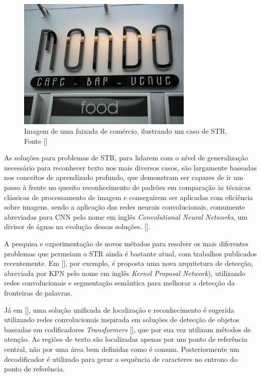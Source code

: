 \begin{figure}
    \centering
    \includegraphics[width=0.75\textwidth]{figs/img_139.jpg}
    \caption{Imagem de uma faixada de comércio, ilustrando um caso de STR. Fonte []}
    \label{fig:str-example}
\end{figure}

As soluções para problemas de STR, para lidarem com o nível de generalização necessário para reconhecer texto nos mais diversos casos, são largamente baseadas nos conceitos de aprendizado profundo, que demonstram ser capazes de ir um passo à frente no quesito reconhecimento de padrões em comparação às técnicas clássicas de processamento de imagem e conseguirem ser aplicadas com eficiência sobre imagens, sendo a aplicação das redes neurais convolucionais, comumente abreviadas para CNN pelo nome em inglês \textit{Convolutional Neural Networks}, um divisor de águas na evolução dessas soluções. [].

A pesquisa e experimentação de novos métodos para resolver os mais diferentes problemas que permeiam o STR ainda é bastante atual, com trabalhos publicados recentemente.
Em [], por exemplo, é proposta uma nova arquitetura de detecção, abreviada por KPN pelo nome em inglês \textit{Kernel Proposal Network}), utilizando redes convolucionais e segmentação semântica para melhorar a detecção da fronteiras de palavras.

Já em [], uma solução unificada de localização e reconhecimento é sugerida utilizando redes convolucionais inspirada em soluções de detecção de objetos baseadas em codificadores \textit{Transformers} [], que por sua vez utilizam métodos de atenção. As regiões de texto são localizadas apenas por um ponto de referência central, não por uma área bem definidas como é comum. Posteriormente um decodificador é utilizado para gerar a sequência de caracteres no entrono do ponto de referência.

